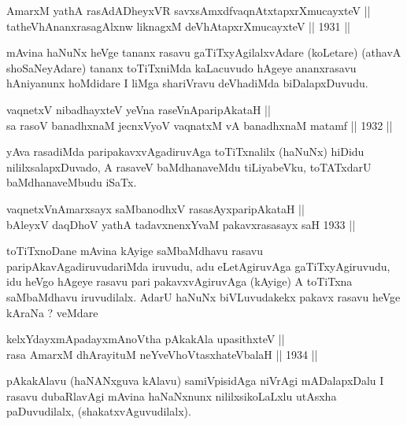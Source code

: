 \begin{shl}
AmarxM yathA rasAdADheyxVR savxsAmxdfvaqnAtxtapxrXmucayxteV || \\
tatheVhAnanxrasagAlxnw liknagxM deVhAtapxrXmucayxteV \hfill || 1931 ||
  
\end{shl}

\begin{artha}
mAvina haNuNx heVge tananx rasavu gaTiTxyAgilalxvAdare (koLetare)
(athavA shoSaNeyAdare) tananx toTiTxniMda kaLacuvudo hAgeye
ananxrasavu hAniyanunx hoMdidare I liMga shariVravu deVhadiMda
biDalapxDuvudu.
\end{artha}


\begin{shl}
vaqnetxV nibadhayxteV yeVna raseVnA\s \s paripAkataH ||  \\
sa rasoV banadhxnaM jecnxVyoV vaqnatxM vA banadhxnaM matamf \hfill || 1932 ||
 
\end{shl}

\begin{artha}
yAva rasadiMda paripakavxvAgadiruvAga toTiTxnalilx (haNuNx) hiDidu
nililxsalapxDuvado, A rasaveV baMdhanaveMdu tiLiyabeVku, toTATxdarU
baMdhanaveMbudu iSaTx.
\end{artha}

\begin{shl}
vaqnetxVnA\s \s marxsayx saMbanodhxV rasasAyx\s \s paripAkataH || \\
bAleyxV daqDhoV yathA tadavxnenxYvaM pakavxrasasayx saH 1933 ||  
\end{shl}

\begin{artha}
toTiTxnoDane mAvina kAyige saMbaMdhavu rasavu
paripAkavAgadiruvudariMda iruvudu, adu eLetAgiruvAga gaTiTxyAgiruvudu,
idu heVgo hAgeye rasavu pari pakavxvAgiruvAga (kAyige) A toTiTxna
saMbaMdhavu iruvudilalx. AdarU haNuNx biVLuvudakekx pakavx rasavu heVge kAraNa ? veMdare 
\end{artha}

\begin{shl}
kelxYdayxmApadayxmAnoV\s tha pAkakAla upasithxteV || \\
rasa AmarxM dhArayituM neYveVhoVtasxhateV\s balaH \hfill || 1934 ||
  
\end{shl}

\begin{artha}
pAkakAlavu (haNANxguva kAlavu) samiVpisidAga niVrAgi mADalapxDalu I
rasavu dubaRlavAgi mAvina haNaNxnunx nililxsikoLaLxlu utAsxha
paDuvudilalx, (shakatxvAguvudilalx).
\end{artha}

